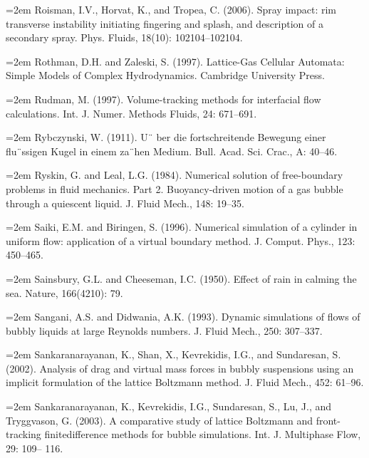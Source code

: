 \documentclass[11pt,a4paper,openany,fontset=none]{ctexbook}
\begin{document}
\par\hangindent=2em Roisman, I.V., Horvat, K., and Tropea, C. (2006). Spray impact: rim transverse instability initiating fingering and splash, and description of a secondary spray. Phys. Fluids, 18(10): 102104--102104.

\par\hangindent=2em Rothman, D.H. and Zaleski, S. (1997). Lattice-Gas Cellular Automata: Simple Models of Complex Hydrodynamics. Cambridge University Press.

\par\hangindent=2em Rudman, M. (1997). Volume-tracking methods for interfacial flow calculations. Int. J. Numer. Methods Fluids, 24: 671--691.

\par\hangindent=2em Rybczynski, W. (1911). U¨ ber die fortschreitende Bewegung einer flu¨ssigen Kugel in einem za¨hen Medium. Bull. Acad. Sci. Crac., A: 40--46.

\par\hangindent=2em Ryskin, G. and Leal, L.G. (1984). Numerical solution of free-boundary problems in fluid mechanics. Part 2. Buoyancy-driven motion of a gas bubble through a quiescent liquid. J. Fluid Mech., 148: 19--35.

\par\hangindent=2em Saiki, E.M. and Biringen, S. (1996). Numerical simulation of a cylinder in uniform flow: application of a virtual boundary method. J. Comput. Phys., 123: 450--465.

\par\hangindent=2em Sainsbury, G.L. and Cheeseman, I.C. (1950). Effect of rain in calming the sea. Nature, 166(4210): 79.

\par\hangindent=2em Sangani, A.S. and Didwania, A.K. (1993). Dynamic simulations of flows of bubbly liquids at large Reynolds numbers. J. Fluid Mech., 250: 307--337.

\par\hangindent=2em Sankaranarayanan, K., Shan, X., Kevrekidis, I.G., and Sundaresan, S. (2002). Analysis of drag and virtual mass forces in bubbly suspensions using an implicit formulation of the lattice Boltzmann method. J. Fluid Mech., 452: 61--96.

\par\hangindent=2em Sankaranarayanan, K., Kevrekidis, I.G., Sundaresan, S., Lu, J., and Tryggvason, G. (2003). A comparative study of lattice Boltzmann and front-tracking finitedifference methods for bubble simulations. Int. J. Multiphase Flow, 29: 109-- 116.
\end{document}
